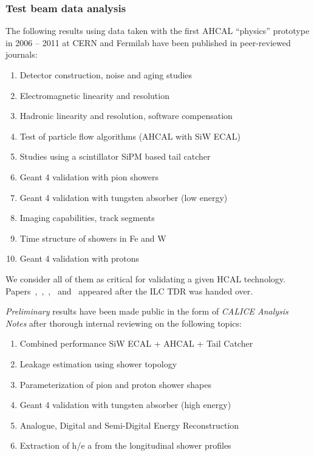 \subsubsection{Test beam data analysis}
The following results using data taken with the first AHCAL ``physics'' prototype in 2006 -- 2011 at CERN and Fermilab have been published in peer-reviewed journals:
\begin{enumerate}
\item Detector construction, noise and aging studies~\cite{1748-0221-5-05-P05004}
\item Electromagnetic linearity and resolution~\cite{1748-0221-6-04-P04003}
\item Hadronic linearity and resolution, software compensation~\cite{1748-0221-7-09-P09017}
\item Test of particle flow algorithms (AHCAL with SiW ECAL)~\cite{1748-0221-6-07-P07005}
\item Studies using a scintillator SiPM based tail catcher~\cite{1748-0221-7-04-P04015}
\item Geant 4 validation with pion showers~\cite{1748-0221-8-07-P07005}
\item Geant 4 validation with tungsten absorber (low energy)~\cite{1748-0221-9-01-P01004}
\item Imaging capabilities, track segments~\cite{1748-0221-8-09-P09001}
\item Time structure of showers in Fe and W~\cite{1748-0221-9-07-P07022}
\item Geant 4 validation with protons~\cite{1748-0221-10-04-P04014}
\end{enumerate}

We consider all of them as critical for validating a given HCAL technology. Papers~\cite{1748-0221-8-07-P07005},~\cite{1748-0221-9-01-P01004},~\cite{1748-0221-8-09-P09001},~\cite{1748-0221-9-07-P07022} and~\cite{1748-0221-10-04-P04014} appeared after the ILC TDR was handed over.

\emph{Preliminary} results have been made public in the form of \emph{CALICE Analysis Notes} after thorough internal reviewing on the following topics:
\begin{enumerate}
\item Combined performance SiW ECAL + AHCAL + Tail Catcher~\cite{Calice:CAN015}
\item Leakage estimation using shower topology~\cite{Marchesini:CAN029}
\item Parameterization of pion and proton shower shapes~\cite{Calice:CAN048}
\item Geant 4 validation with tungsten absorber (high energy)~\cite{Calice:CAN044}
\item Analogue, Digital and Semi-Digital Energy Reconstruction~\cite{Calice:CAN049}
\item Extraction of h/e a from the longitudinal shower profiles~\cite{Calice:CAN051}
\end{enumerate}

